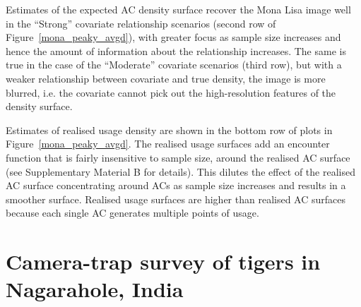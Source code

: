 \documentclass[useAMS,usenatbib,referee]{biom}
\begin{document}
Estimates of the expected AC density surface recover the Mona Lisa image well in the ``Strong'' covariate relationship scenarios (second row of Figure~\ref{mona_peaky_avgd}), with greater focus as sample size increases and hence the amount of information about the relationship increases. The same is true in the case of the ``Moderate'' covariate scenarios (third row), but with a weaker relationship between covariate and true density, the image is more blurred, i.e. the covariate cannot pick out the high-resolution features of the density surface.

Estimates of realised usage density are shown in the bottom row of plots in Figure~\ref{mona_peaky_avgd}. The realised usage surfaces add an encounter function that is fairly insensitive to sample size, around the realised AC surface (see Supplementary Material B for details). This dilutes the effect of the realised AC surface concentrating around ACs as sample size increases and results in a smoother surface. Realised usage surfaces are higher than realised AC surfaces because each single AC generates multiple points of usage.



\section{Camera-trap survey of tigers in Nagarahole, India}
\end{document}
